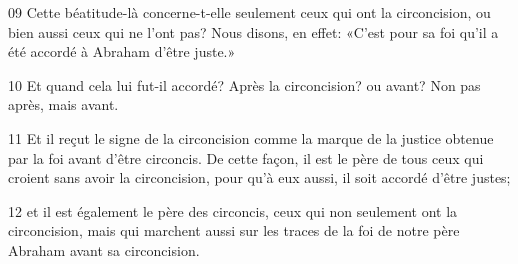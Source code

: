
09 Cette béatitude-là concerne-t-elle seulement ceux qui ont la circoncision, ou bien aussi ceux qui ne l’ont pas? Nous disons, en effet: «C’est pour sa foi qu’il a été accordé à Abraham d’être juste.»

10 Et quand cela lui fut-il accordé? Après la circoncision? ou avant? Non pas après, mais avant.

11 Et il reçut le signe de la circoncision comme la marque de la justice obtenue par la foi avant d’être circoncis. De cette façon, il est le père de tous ceux qui croient sans avoir la circoncision, pour qu’à eux aussi, il soit accordé d’être justes;

12 et il est également le père des circoncis, ceux qui non seulement ont la circoncision, mais qui marchent aussi sur les traces de la foi de notre père Abraham avant sa circoncision.
